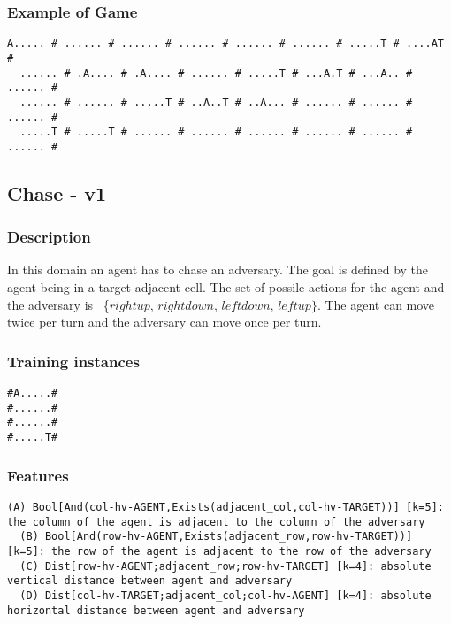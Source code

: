 \documentclass[a4paper]{article}
\begin{document}
\subsubsection{Example of Game}
\begin{Verbatim}[fontsize=\footnotesize]
  A..... # ...... # ...... # ...... # ...... # ...... # .....T # ....AT #
  ...... # .A.... # .A.... # ...... # .....T # ...A.T # ...A.. # ...... #
  ...... # ...... # .....T # ..A..T # ..A... # ...... # ...... # ...... #
  .....T # .....T # ...... # ...... # ...... # ...... # ...... # ...... #
\end{Verbatim}


\subsection{Chase - v1}
\subsubsection{Description}
In this domain an agent has to chase an adversary. The goal is defined by the agent being in a target adjacent cell. The set of possile actions for the agent and the adversary is ~\{$rightup$, $rightdown$, $leftdown$, $leftup\}$. The agent can move twice per turn and the adversary can move once per turn.

\subsubsection{Training instances}
\begin{Verbatim}[fontsize=\footnotesize]
#A.....#
#......#
#......#
#.....T#
\end{Verbatim}

\subsubsection{Features}
\begin{Verbatim}[fontsize=\footnotesize]
  (A) Bool[And(col-hv-AGENT,Exists(adjacent_col,col-hv-TARGET))] [k=5]: the column of the agent is adjacent to the column of the adversary
  (B) Bool[And(row-hv-AGENT,Exists(adjacent_row,row-hv-TARGET))] [k=5]: the row of the agent is adjacent to the row of the adversary
  (C) Dist[row-hv-AGENT;adjacent_row;row-hv-TARGET] [k=4]: absolute vertical distance between agent and adversary
  (D) Dist[col-hv-TARGET;adjacent_col;col-hv-AGENT] [k=4]: absolute horizontal distance between agent and adversary
\end{Verbatim}
\end{document}
